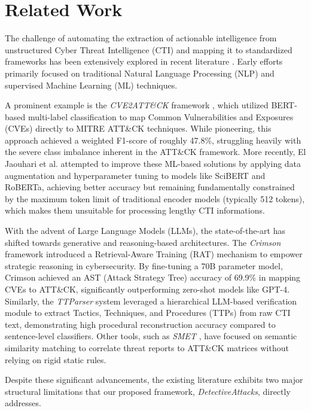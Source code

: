 \documentclass[conference]{IEEEtran}
\begin{document}
\section{Related Work}
\label{related_work}
The challenge of automating the extraction of actionable intelligence from unstructured Cyber Threat Intelligence (CTI) and mapping it to standardized frameworks has been extensively explored in recent literature \cite{Anooja_2025,carroll2025strengthening_MitreATLAS}. Early efforts primarily focused on traditional Natural Language Processing (NLP) and supervised Machine Learning (ML) techniques. 

A prominent example is the \textit{CVE2ATT\&CK} framework \cite{cve2attack_2022}, which utilized BERT-based multi-label classification to map Common Vulnerabilities and Exposures (CVEs) directly to MITRE ATT\&CK techniques. While pioneering, this approach achieved a weighted F1-score of roughly 47.8\%, struggling heavily with the severe class imbalance inherent in the ATT\&CK framework. More recently, El Jaouhari et al. \cite{compsac_2024} attempted to improve these ML-based solutions by applying data augmentation and hyperparameter tuning to models like SciBERT and RoBERTa, achieving better accuracy but remaining fundamentally constrained by the maximum token limit of traditional encoder models (typically 512 tokens), which makes them unsuitable for processing lengthy CTI informations.

With the advent of Large Language Models (LLMs), the state-of-the-art has shifted towards generative and reasoning-based architectures. The \textit{Crimson} framework \cite{crimson_2024} introduced a Retrieval-Aware Training (RAT) mechanism to empower strategic reasoning in cybersecurity. By fine-tuning a 70B parameter model, Crimson achieved an AST (Attack Strategy Tree) accuracy of 69.9\% in mapping CVEs to ATT\&CK, significantly outperforming zero-shot models like GPT-4. Similarly, the \textit{TTParser} system \cite{ttparser_2026} leveraged a hierarchical LLM-based verification module to extract Tactics, Techniques, and Procedures (TTPs) from raw CTI text, demonstrating high procedural reconstruction accuracy compared to sentence-level classifiers. Other tools, such as \textit{SMET} \cite{smet_2024}, have focused on semantic similarity matching to correlate threat reports to ATT\&CK matrices without relying on rigid static rules.

Despite these significant advancements, the existing literature exhibits two major structural limitations that our proposed framework, \textit{DetectiveAttacks}, directly addresses. 
\end{document}
